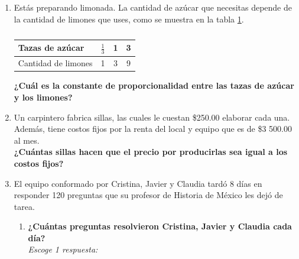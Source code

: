 \documentclass[11pt]{book}
\begin{document}
\begin{enumerate}

  \item Estás preparando limonada. La cantidad de azúcar que necesitas depende de la cantidad de limones que uses,
        como se muestra en la tabla \ref{tab:azucar_limon}.
        \begin{table}[!h]
          \centering
          \begin{tabular}{|l|c|c|c|}
            \hline
            Tazas de azúcar     & $\frac{1}{3}$ & 1 & 3 \\
            \hline
            Cantidad de limones & 1             & 3 & 9 \\
            \hline
          \end{tabular}
          \caption{}
          \label{tab:azucar_limon}
        \end{table}

        \textbf{¿Cuál es la constante de proporcionalidad entre las tazas de azúcar y los limones?}
        \vspace{2cm}
  \item Un carpintero fabrica sillas, las cuales le cuestan \$250.00 elaborar cada una. Además, tiene costos fijos por la renta del local y equipo que es de \$3 500.00 al mes. \\
        \textbf{¿Cuántas sillas hacen que el precio por producirlas sea igual a los costos fijos?}\\
        \vspace{2cm}
  \item El equipo conformado por Cristina, Javier y Claudia tardó 8 días en responder 120 preguntas que su profesor de Historia de México les dejó de tarea.

        \begin{enumerate}
          \item \textbf{¿Cuántas preguntas resolvieron Cristina, Javier y Claudia cada día?}\\
                \emph{Escoge 1 respuesta:}


\end{enumerate}
\end{enumerate}
\end{document}
